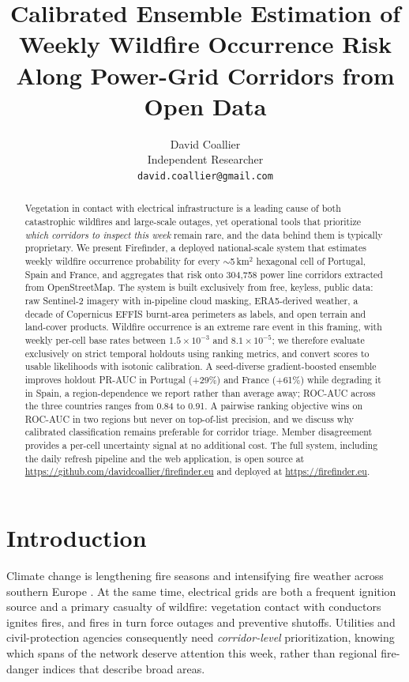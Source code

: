 \documentclass[11pt]{article}
\title{\bfseries Calibrated Ensemble Estimation of Weekly Wildfire Occurrence
Risk Along Power-Grid Corridors from Open Data}
\author{%
  David Coallier\\
  Independent Researcher\\
  \texttt{david.coallier@gmail.com}
}
\date{}
\begin{document}
\maketitle

\begin{abstract}
Vegetation in contact with electrical infrastructure is a leading cause of both
catastrophic wildfires and large-scale outages, yet operational tools that
prioritize \emph{which corridors to inspect this week} remain rare, and the
data behind them is typically proprietary. We present Firefinder, a deployed
national-scale system that estimates weekly wildfire occurrence probability for
every $\sim$5\,km$^2$ hexagonal cell of Portugal, Spain and France, and
aggregates that risk onto 304{,}758 power line corridors extracted from
OpenStreetMap. The system is built exclusively from free, keyless, public data:
raw Sentinel-2 imagery with in-pipeline cloud masking, ERA5-derived weather,
a decade of Copernicus EFFIS burnt-area perimeters as labels, and open terrain
and land-cover products. Wildfire occurrence is an extreme rare event in this framing,
with weekly per-cell base rates between $1.5\times10^{-3}$ and
$8.1\times10^{-5}$; we therefore evaluate exclusively on strict temporal
holdouts using ranking metrics, and convert scores to usable likelihoods with
isotonic calibration. A seed-diverse gradient-boosted ensemble improves
holdout PR-AUC in Portugal (+29\%) and France (+61\%) while degrading it in Spain, a
region-dependence we report rather than average away; ROC-AUC across the
three countries ranges from 0.84 to 0.91. A pairwise ranking
objective wins on ROC-AUC in two regions but never on top-of-list precision,
and we discuss why calibrated classification remains preferable for corridor
triage. Member
disagreement provides a per-cell uncertainty signal at no additional cost. The
full system, including the daily refresh pipeline and the web application, is
open source at \url{https://github.com/davidcoallier/firefinder.eu} and
deployed at \url{https://firefinder.eu}.
\end{abstract}

\section{Introduction}

Climate change is lengthening fire seasons and intensifying fire weather
across southern Europe \citep{jones2022global}. At the same time, electrical
grids are both a frequent ignition source and a primary casualty of wildfire:
vegetation contact with conductors ignites fires, and fires in turn force
outages and preventive shutoffs. Utilities and civil-protection agencies
consequently need \emph{corridor-level} prioritization, knowing which spans of
the network deserve attention this week, rather than regional fire-danger
indices that describe broad areas.
\end{document}
